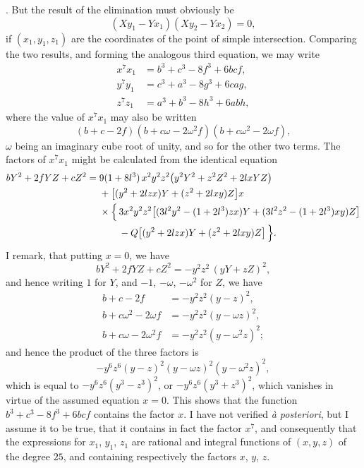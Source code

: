 \documentclass[11pt]{article}
\begin{document}
. But the result of the elimination must obviously be
\[
  (Xy_1 - Yx_1)(Xy_2 - Yx_2) = 0,
\]
if $(x_1, y_1, z_1)$ are the coordinates of the point of simple intersection. Comparing the two results, and forming the analogous third equation, we may write
\[
\begin{aligned}
  x^7 x_1 &= b^3 + c^3 - 8f^3 + 6bcf,\\
  y^7 y_1 &= c^3 + a^3 - 8g^3 + 6cag,\\
  z^7 z_1 &= a^3 + b^3 - 8h^3 + 6abh,
\end{aligned}
\]
where the value of $x^7 x_1$ may also be written
\[
  (b + c - 2f)(b + c\omega - 2\omega^2 f)(b + c\omega^2 - 2\omega f),
\]
$\omega$ being an imaginary cube root of unity, and so for the other two terms. The factors of $x^7 x_1$ might be calculated from the identical equation
\[
\begin{aligned}
  bY^2 + 2f YZ + cZ^2 ={}& 9(1 + 8l^3)\,x^2 y^2 z^2\bigl(y^2 Y^2 + z^2 Z^2 + 2lx YZ\bigr)\\
  &{} + \bigl[(y^2 + 2lzx) Y + (z^2 + 2lxy) Z\bigr] x\\
  &{} \times \Bigl\{\,3x^2 y^2 z^2 \bigl[(3l^2 y^2 - (1 + 2l^3) zx) Y + (3l^2 z^2 - (1 + 2l^3) xy) Z\bigr]\\
  &\hphantom{{} \times \Bigl\{}\, - Q\bigl[(y^2 + 2lzx) Y + (z^2 + 2lxy) Z\bigr]\,\Bigr\}.
\end{aligned}
\]
I remark, that putting $x = 0$, we have
\[
  bY^2 + 2fYZ + cZ^2 = -y^2 z^2\,(yY + zZ)^2,
\]
and hence writing $1$ for $Y$, and $-1$, $-\omega$, $-\omega^2$ for $Z$, we have
\[
\begin{aligned}
  b + c - 2f          &= -y^2 z^2 (y - z)^2,\\
  b + c\omega^2 - 2\omega f   &= -y^2 z^2 (y - \omega z)^2,\\
  b + c\omega   - 2\omega^2 f &= -y^2 z^2 (y - \omega^2 z)^2;
\end{aligned}
\]
and hence the product of the three factors is
\[
  -y^6 z^6 (y - z)^2 (y - \omega z)^2 (y - \omega^2 z)^2,
\]
which is equal to $-y^6 z^6 (y^3 - z^3)^2$, or $-y^6 z^6 (y^3 + z^3)^2$, which vanishes in virtue of the assumed equation $x = 0$. This shows that the function $b^3 + c^3 - 8f^3 + 6bcf$ contains the factor $x$. I have not verified \emph{\`a posteriori}, but I assume it to be true, that it contains in fact the factor $x^7$, and consequently that the expressions for $x_1$, $y_1$, $z_1$ are rational and integral functions of $(x, y, z)$ of the degree $25$, and containing respectively the factors $x$, $y$, $z$.
\end{document}
